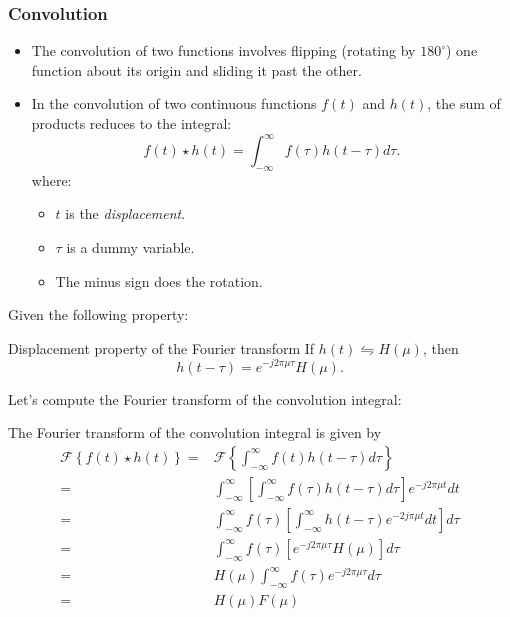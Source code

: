 \begin{frame}
\frametitle{Convolution}
\begin{itemize}
\item The convolution of two functions involves flipping (rotating by $180^{\circ}$) one function about its origin and sliding it past the other.
\item In the convolution of two continuous functions $f(t)$ and $h(t)$, the sum of products reduces to the integral:
\begin{equation}
f(t) \star h(t) = \int_{-\infty}^{\infty} f(\tau)h(t-\tau) d\tau.
\end{equation}
where:
\begin{itemize}
\item $t$ is the \textit{displacement}.
\item $\tau$ is a dummy variable.
\item The minus sign does the rotation.
\end{itemize}
\end{itemize}
\end{frame}


\begin{frame}
Given the following property:
\begin{block}{Displacement property of the Fourier transform}
If $h(t) \leftrightharpoons H(\mu)$, then
\begin{equation}
h(t-\tau) = e^{-j2\pi \mu\tau} H(\mu).
\end{equation}
\end{block}
Let's compute the Fourier transform of the convolution integral:
\end{frame}


\begin{frame}
The Fourier transform of the convolution integral is given by
\begin{equation}
\begin{split}
\mathcal{F} \left \{ f(t) \star h(t) \right \} = & \mathcal{F} \left \{ \int_{-\infty}^{\infty} f(t) h(t-\tau) d\tau \right \} \\
= & \int_{-\infty}^{\infty} \left [ \int_{-\infty}^{\infty} f(\tau) h(t-\tau) d\tau \right ] e^{-j2\pi \mu t} dt \\
= & \int_{-\infty}^{\infty} f(\tau) \left [ \int_{-\infty}^{\infty} h(t-\tau) e^{-2j\pi \mu t} dt \right ] d\tau \\
= & \int_{-\infty}^{\infty} f(\tau) \left [ e^{-j2\pi \mu\tau} H(\mu) \right ] d\tau\\
= & H(\mu) \int_{-\infty}^{\infty} f(\tau) e^{-j2\pi \mu\tau} d\tau \\
= & H(\mu)F(\mu)
\end{split}
\end{equation}
\end{frame}

